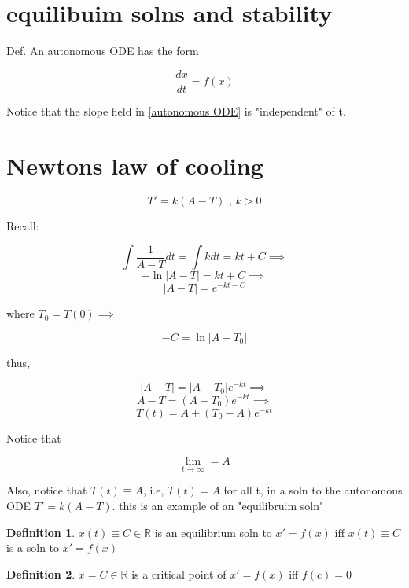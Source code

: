 \documentclass[10pt,a4paper]{article}
\theoremstyle{definition}
\newtheorem*{definition}{Definition}
\begin{document}

  \newpage 

\section*{equilibuim solns and stability}

  Def. An autonomous ODE has the form 

  \begin{equation}
    \tag{1}
    \label{autonomous ODE}
    \frac{dx}{dt} = f(x) 
  \end{equation}

  Notice that the slope field in \eqref{autonomous ODE} is "independent"
  of t.

\section*{ Newtons law of cooling} 

  \[ T' = k(A-T) \text{ , } k>0 \]

  Recall:

  \[ \int \frac{1}{A-T}dt = \int kdt = kt + C \implies \]
  \[ -\ln |A-T| = kt +C \implies  \]
  \[ |A-T| = e^{-kt-C} \]

  where \( T_0 = T(0) \implies  \)

  \[ -C = \ln |A-T_0|  \] 

  thus, 

  \[ |A-T| = |A-T_0|e^{-kt} \implies \]
  \[ A-T = (A-T_0)e^{-kt} \implies \]
  \[ \boxed{T(t) = A + (T_0-A)e^{-kt} } \]

  Notice that 

  \[ \lim_{t \to \infty} = A \]

  Also, notice that \( T(t) \equiv A \),  i.e, \( T(t) = A \) for all t,
  in a soln to the autonomous ODE \( T' = k(A-T) \). this is  an example
  of an "equilibruim soln" \\[5mm] 

  \begin{definition}
   \( x(t) \equiv  C \in \mathbb{R} \) is an equilibrium soln to \( x' =
   f(x) \text{ iff } x(t) \equiv C \) is a soln to \( x' = f(x) \)
  \end{definition}

  \begin{definition}
   \( x = C \in \mathbb{R}  \) is a critical point of \( x' = f(x) \) iff \( f(c) = 0 \)
  \end{definition}
\end{document}
